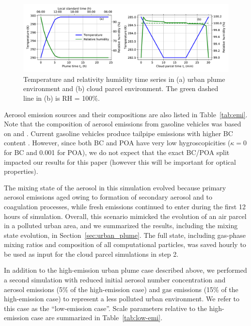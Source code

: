 \documentclass[edeposit,fullpage]{uiucthesis2009}
\begin{document}
\begin{figure}[H]
	\centering \includegraphics[width=\textwidth]{chap3_figs/fig1.pdf}
	\caption{Temperature and relativity humidity time series in (a)
		urban plume environment and (b) cloud parcel environment. The
		green dashed line in (b) is RH = 100$\%$.}
	\label{fig:env}
\end{figure}

Aerosol emission sources and their compositions are also listed in
Table~\ref{tab:emi}. Note that the composition of aerosol
  emissions from gasoline vehicles was based on
  \citet{somers2004mobile} and \citet{nam2008analysis}. Current
  gasoline vehicles produce tailpipe emissions with higher BC content
  \citep{liggio2012emissions}. However, since both BC and POA have very
  low hygroscopicities ($\kappa=0$ for BC and 0.001 for POA), we do
  not expect that the exact BC/POA split impacted our results for this
  paper (however this will be important for optical properties).

The mixing state of the aerosol in this simulation evolved because
primary aerosol emissions aged owing to formation of secondary aerosol
and to coagulation processes, while fresh emissions continued to enter
during the first 12 hours of simulation. Overall, this scenario
mimicked the evolution of an air parcel in a polluted urban area, and
we summarized the results, including the mixing state evolution, in
Section~\ref{sec:urban_plume}. The full state, including gas-phase
mixing ratios and composition of all computational particles, was
saved hourly to be used as input for the cloud parcel simulations in
step 2.

In addition to the high-emission urban plume case described
  above, we performed a second simulation with reduced initial aerosol
  number concentration and aerosol emissions (5\% of the high-emission
  case) and gas emissions (15\% of the high-emission case) to
  represent a less polluted urban environment. We refer to this case
  as the ``low-emission case''.  Scale parameters relative to the
  high-emission case are summarized in Table~\ref{tab:low-emi}.
\end{document}
